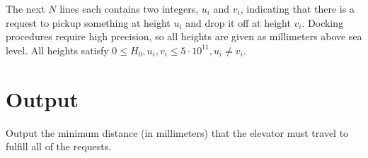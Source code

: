The next $N$ lines each contains two integers, $u_i$ and $v_i$, indicating 
that there is a request to pickup something at height $u_i$ and drop it off 
at height $v_i$.  Docking procedures require high precision, so all heights 
are given as millimeters above sea level. All heights satisfy $0 \le H_0, 
u_i, v_i \le 5 \cdot 10^{11}, u_i \neq v_i$.

\section*{Output}

Output the minimum distance (in millimeters) that the elevator must travel
to fulfill all of the requests.
